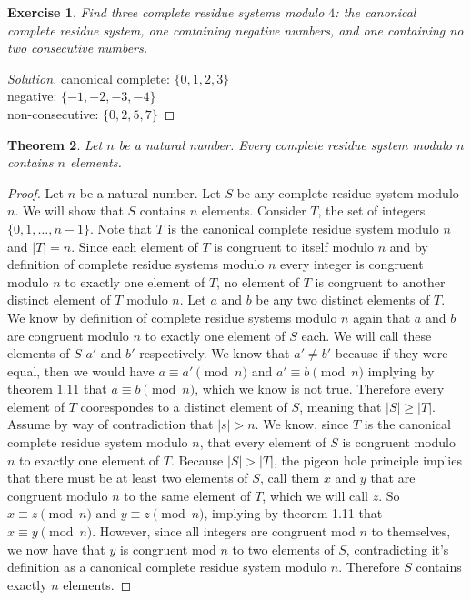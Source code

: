 \documentclass[12pt,leqno]{article}
\numberwithin{equation}{section}
\newtheorem{thm}{Theorem}[section]
\newtheorem{exer}[thm]{Exercise}
\theoremstyle{definition}
\newcommand{\card}[1]{\left| #1 \right|}
\begin{document}
\begin{exer}
Find three complete residue systems modulo $4$: the canonical
complete residue system, one containing negative numbers, and one
containing no two consecutive numbers.
\end{exer}

\begin{proof}[Solution]
canonical complete: $\{0, 1, 2, 3\}$\\
negative: $\{-1,-2,-3,-4\}$\\
non-consecutive: $\{0, 2, 5, 7\}$
\end{proof}


\pagebreak
\begin{thm}
Let $n$ be a natural number. Every complete residue system modulo
$n$ contains $n$ elements.
\end{thm}

\begin{proof}[Proof]
Let $n$ be a natural number.  Let $S$ be any complete residue system modulo $n$.  We will show that $S$ contains $n$ elements.  Consider $T$, the set of integers $\{0, 1, \ldots , n-1\}$.  Note that $T$ is the canonical complete residue system modulo $n$ and $\card{T} = n$.  Since each element of $T$ is congruent to itself modulo $n$ and by definition of complete residue systems modulo $n$ every integer is congruent modulo $n$ to exactly one element of $T$, no element of $T$ is congruent to another distinct element of $T$ modulo $n$.  Let $a$ and $b$ be any two distinct elements of $T$.  We know by definition of complete residue systems modulo $n$ again that $a$ and $b$ are congruent modulo $n$ to exactly one element of $S$ each.  We will call these elements of $S$ $a'$ and $b'$ respectively.  We know that $a' \neq b'$ because if they were equal, then we would have $a \equiv a' \pmod{n}$ and $a' \equiv b \pmod{n}$ implying by theorem 1.11 that $a \equiv b \pmod{n}$, which we know is not true.  Therefore every element of $T$ coorespondes to a distinct element of $S$, meaning that $\card{S} \geq \card{T}$.  Assume by way of contradiction that $\card{s} > n$.  We know, since $T$ is the canonical complete residue system modulo $n$, that every element of $S$ is congruent modulo $n$ to exactly one element of $T$.  Because $\card{S} > \card{T}$, the pigeon hole principle implies that there must be at least two elements of $S$, call them $x$ and $y$ that are congruent modulo $n$ to the same element of $T$, which we will call $z$. So $x \equiv z \pmod{n}$ and $y \equiv z \pmod{n}$, implying by theorem 1.11 that $x \equiv y \pmod{n}$.  However, since all integers are congruent mod $n$ to themselves, we now have that $y$ is congruent mod $n$ to two elements of $S$, contradicting it's definition as a canonical complete residue system modulo $n$.  Therefore $S$ contains exactly $n$ elements.
\end{proof}
\end{document}
